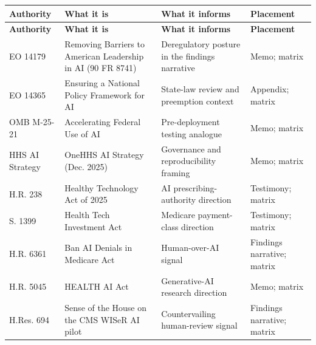 \documentclass[11pt]{article}
\begin{document}
{\footnotesize
\begin{xltabular}{\textwidth}{L{2.7cm} L{4.3cm} Y L{2.5cm}}
\hline
\textbf{Authority} & \textbf{What it is} & \textbf{What it informs} &
\textbf{Placement}\\
\hline
\endfirsthead
\hline
\textbf{Authority} & \textbf{What it is} & \textbf{What it informs} &
\textbf{Placement}\\
\hline
\endhead
\hline
\endlastfoot
EO 14179 & Removing Barriers to American Leadership in AI (90 FR 8741) &
Deregulatory posture in the findings narrative \cite{eo-14179} & Memo; matrix\\
EO 14365 & Ensuring a National Policy Framework for AI & State-law review and
preemption context \cite{eo-14365} & Appendix; matrix\\
OMB M-25-21 & Accelerating Federal Use of AI & Pre-deployment testing analogue
\cite{omb-m2521} & Memo; matrix\\
HHS AI Strategy & OneHHS AI Strategy (Dec. 2025) & Governance and reproducibility
framing \cite{hhs-ai-strategy-2025} & Memo; matrix\\
H.R. 238 & Healthy Technology Act of 2025 & AI prescribing-authority direction
\cite{hr238-healthy-tech} & Testimony; matrix\\
S. 1399 & Health Tech Investment Act & Medicare payment-class direction
\cite{s1399-health-tech-investment} & Testimony; matrix\\
H.R. 6361 & Ban AI Denials in Medicare Act & Human-over-AI signal
\cite{hr6361-ban-ai-denials} & Findings narrative; matrix\\
H.R. 5045 & HEALTH AI Act & Generative-AI research direction
\cite{hr5045-health-ai} & Memo; matrix\\
H.Res. 694 & Sense of the House on the CMS WISeR AI pilot & Countervailing
human-review signal \cite{hres694-wiser} & Findings narrative; matrix\\
\end{xltabular}}

\clearpage
{}
{}

\end{document}
